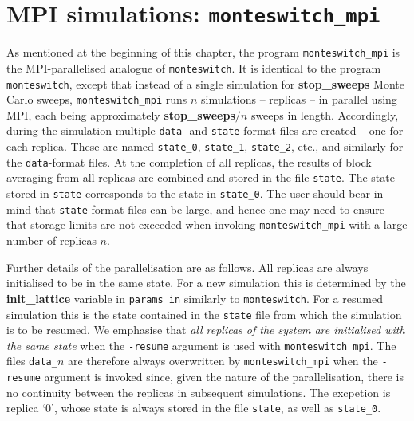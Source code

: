 \documentclass{report}
\begin{document}
\section{MPI simulations: \texttt{monteswitch\_mpi}}
As mentioned at the beginning of this chapter, the program \texttt{monteswitch\_mpi} is the MPI-parallelised analogue of \texttt{monteswitch}. 
It is identical to the program \texttt{monteswitch}, except that instead of a single simulation for \textbf{stop\_sweeps} Monte Carlo sweeps, 
\texttt{monteswitch\_mpi} runs $n$ simulations -- replicas -- in parallel using MPI, each being approximately \textbf{stop\_sweeps}$/n$ sweeps in 
length. Accordingly, during the simulation multiple \texttt{data}- and \texttt{state}-format files are created -- one for each replica. These 
are named \texttt{state\_0}, \texttt{state\_1}, \texttt{state\_2}, etc., and similarly for the \texttt{data}-format files. At the completion of 
all replicas, the results of block averaging from all replicas are combined and stored in the file \texttt{state}. The state stored in \texttt{state}
corresponds to the state in \texttt{state\_0}. 
The user should bear in mind that \texttt{state}-format files can be large, and hence one may need to ensure that storage limits are not exceeded when
invoking \texttt{monteswitch\_mpi} with a large number of replicas $n$.

Further details of the parallelisation are as follows. All replicas are always initialised to be in the same state. For a new simulation this is 
determined by the \textbf{init\_lattice} variable in \texttt{params\_in} similarly to \texttt{monteswitch}. For a resumed simulation this is the state 
contained in the \texttt{state} file from which the simulation is to be resumed. We emphasise that \emph{all replicas of the system are initialised with 
the same state} when the \texttt{-resume} argument is used with \texttt{monteswitch\_mpi}. 
The files \texttt{data\_}$n$ are therefore always overwritten by \texttt{monteswitch\_mpi} when the \texttt{-resume} argument is
invoked since, given the nature of the parallelisation, there is no continuity between the replicas in subsequent simulations. The excpetion is replica `0',
whose state is always stored in the file \texttt{state}, as well as \texttt{state\_0}.
\end{document}
